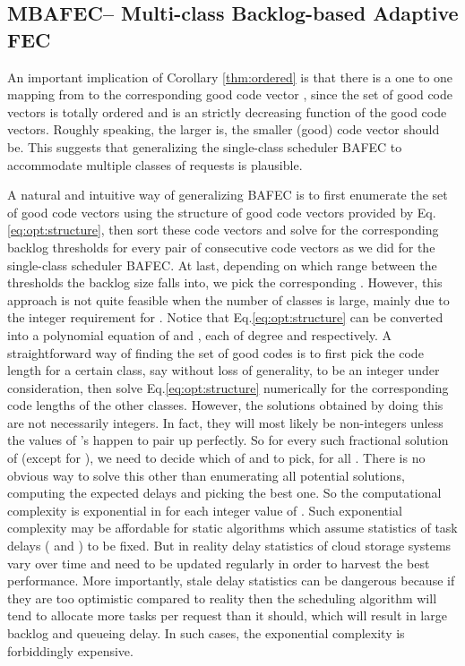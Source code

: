 \documentclass[journal]{IEEEtran}
\newcommand{\nonBlocking}{{BAFEC}\xspace}
\newcommand{\multiclass}{{MBAFEC}\xspace}
\begin{document}
\subsection{\multiclass -- Multi-class Backlog-based Adaptive FEC}
\label{ssec:multi:algorithm}

An important implication of Corollary \ref{thm:ordered} is that there is a one to one mapping from  to the corresponding good code vector , since the set of good code vectors is totally ordered and  is an strictly decreasing function of the good code vectors. Roughly speaking, the larger  is, the smaller (good) code vector should be. This suggests that generalizing the single-class scheduler \nonBlocking to accommodate multiple classes of requests is plausible. 

A natural and intuitive way of generalizing \nonBlocking is to first enumerate the set of good code vectors using the structure of good code vectors provided by Eq.\ref{eq:opt:structure}, then sort these code vectors and solve for the corresponding backlog thresholds for every pair of consecutive code vectors as we did for the single-class scheduler \nonBlocking. At last, depending on which range between the thresholds the backlog size falls into, we pick the corresponding .  However, this approach is not quite feasible when the number of classes  is large, mainly due to the integer requirement for . Notice that Eq.\ref{eq:opt:structure} can be converted into a polynomial equation of  and , each of degree  and  respectively. A straightforward way of finding the set of good codes is to first pick the code length for a certain class, say  without loss of generality, to be an integer under consideration, then solve Eq.\ref{eq:opt:structure} numerically for the corresponding code lengths of the other classes. However, the solutions obtained by doing this are not necessarily integers. In fact, they will most likely be non-integers unless the values of 's happen to pair up perfectly. So for every such fractional solution of  (except for ), we need to decide which of  and  to pick, for all . There is no obvious way to solve this other than enumerating all  potential solutions, computing the expected delays and picking the best one. So the computational complexity is exponential in  for each integer value of . Such exponential complexity may be affordable for static algorithms which assume statistics of task delays ( and ) to be fixed. But in reality delay statistics of cloud storage systems vary over time and need to be updated regularly in order to harvest the best performance. More importantly, stale delay statistics can be dangerous because if they are too optimistic compared to reality then the scheduling algorithm will tend to allocate more tasks per request than it  should, which will result in large backlog and queueing delay. In such cases, the exponential complexity is forbiddingly expensive. 
\end{document}
